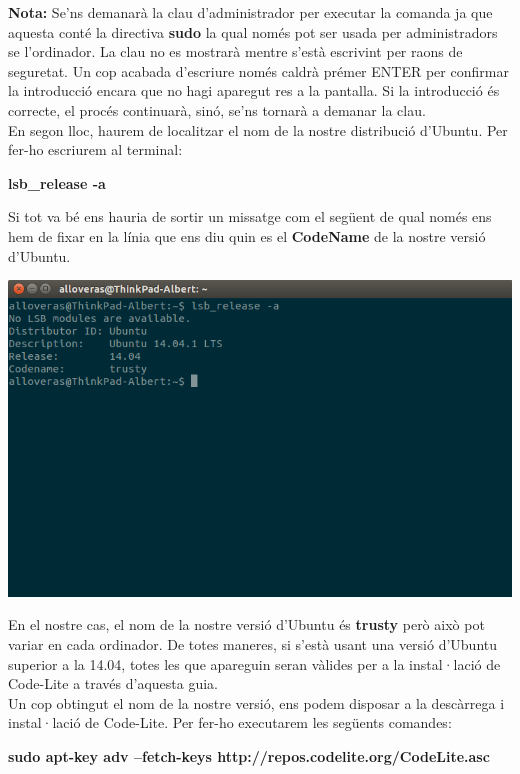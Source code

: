 \documentclass[11pt]{article}
\begin{document}
\noindent \textbf{Nota:} Se'ns demanarà la clau d'administrador per executar la comanda ja que aquesta conté la directiva \textbf{sudo} la qual només pot ser usada per administradors se l'ordinador. La clau no es mostrarà mentre s'està escrivint per raons de seguretat. Un cop acabada d'escriure només caldrà prémer ENTER per confirmar la introducció encara que no hagi aparegut res a la pantalla. Si la introducció és correcte, el procés continuarà, sinó, se'ns tornarà a demanar la clau. \\

\noindent En segon lloc, haurem de localitzar el nom de la nostre distribució d'Ubuntu. Per fer-ho escriurem al terminal:
\begin{center}
	\textbf{lsb\_release -a}
\end{center}

\pagebreak
\noindent Si tot va bé ens hauria de sortir un missatge com el següent de qual només ens hem de fixar en la línia que ens diu quin es el \textbf{CodeName} de la nostre versió d'Ubuntu.
\begin{center}
	\includegraphics[scale=0.3]{img/Ubuntu_Code_Name.png}
\end{center}
\noindent En el nostre cas, el nom de la nostre versió d'Ubuntu és \textbf{trusty} però això pot variar en cada ordinador. De totes maneres, si s'està usant una versió d'Ubuntu superior a la 14.04, totes les que apareguin seran vàlides per a la instal·lació de Code-Lite a través d'aquesta guia. \\

\noindent Un cop obtingut el nom de la nostre versió, ens podem disposar a la descàrrega i instal·lació de Code-Lite. Per fer-ho executarem les següents comandes:
\begin{center}
	\small{\textbf{sudo apt-key adv --fetch-keys http://repos.codelite.org/CodeLite.asc}}
\end{center}
\end{document}
